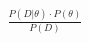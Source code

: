 \documentclass[preview]{standalone}
\begin{document}
\begin{align*}
\frac{P(D|\theta) \cdot P(\theta)}{P(D)}
\end{align*}
\end{document}
